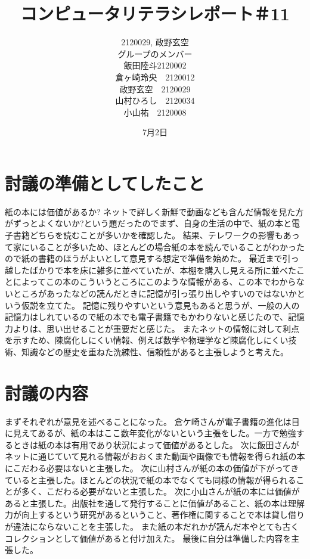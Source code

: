 \documentclass[12pt,a4j]{jarticle}
\begin{document}
\title{コンピュータリテラシレポート＃11}
\author{2120029, 政野玄空\\
グループのメンバー\\
飯田陸斗2120002\\
倉ヶ崎玲央　2120012\\
政野玄空　2120029\\
山村ひろし　2120034\\
小山祐　2120008\\
}
\date{7月2日}
\maketitle


\section{討議の準備としてしたこと}
紙の本には価値があるか? ネットで詳しく新鮮で動画なども含んだ情報を見た方がずっとよくないか?という題だったのでまず、自身の生活の中で、紙の本と電子書籍どちらを読むことが多いかを確認した。
結果、テレワークの影響もあって家にいることが多いため、ほとんどの場合紙の本を読んでいることがわかったので紙の書籍のほうがよいとして意見する想定で準備を始めた。
最近まで引っ越したばかりで本を床に雑多に並べていたが、本棚を購入し見える所に並べたことによってこの本のこういうところにこのような情報がある、この本でわからないところがあったなどの読んだときに記憶が引っ張り出しやすいのではないかという仮説を立てた。
記憶に残りやすいという意見もあると思うが、一般の人の記憶力はしれているので紙の本でも電子書籍でもかわりないと感じたので、記憶力よりは、思い出せることが重要だと感じた。
またネットの情報に対して利点を示すため、陳腐化しにくい情報、例えば数学や物理学など陳腐化しにくい技術、知識などの歴史を重ねた洗練性、信頼性があると主張しようと考えた。
\section{討議の内容}
まずそれぞれが意見を述べることになった。
倉ケ崎さんが電子書籍の進化は目に見えてあるが、紙の本はここ数年変化がないという主張をした。一方で勉強するときは紙の本は有用であり状況によって価値があるとした。
次に飯田さんがネットに通じていて見れる情報がおおくまた動画や画像でも情報を得られ紙の本にこだわる必要はないと主張した。
次に山村さんが紙の本の価値が下がってきていると主張した。ほとんどの状況で紙の本でなくても同様の情報が得られることが多く、こだわる必要がないと主張した。
次に小山さんが紙の本には価値があると主張した。出版社を通して発行することに価値があること、紙の本は理解力が向上するという研究があるということ、著作権に関することで本は貸し借りが違法にならないことを主張した。
また紙の本だれかが読んだ本やとても古くコレクションとして価値があると付け加えた。
最後に自分は準備した内容を主張した。
\end{document}
